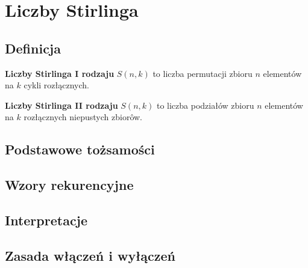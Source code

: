 
\section{Liczby Stirlinga}

\subsection{Definicja}

\begin{definition}
    \textbf{Liczby Stirlinga I rodzaju} $S(n, k)$ to liczba permutacji zbioru $n$ elementów na $k$ cykli rozłącznych.
\end{definition}

\begin{definition}
    \textbf{Liczby Stirlinga II rodzaju} $S(n, k)$ to liczba podziałów zbioru $n$ elementów na $k$ rozłącznych niepustych zbiorôw.
\end{definition}

\subsection{Podstawowe tożsamości}

\subsection{Wzory rekurencyjne}

\subsection{Interpretacje}

\subsection{Zasada włączeń i wyłączeń}


